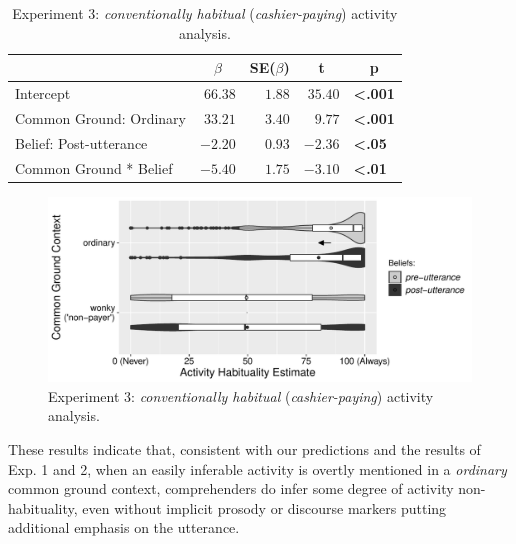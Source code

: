 \documentclass{sp}\usepackage[]{graphicx}\usepackage[]{color}
\makeatletter
\def\maxwidth{ %
  \ifdim\Gin@nat@width>\linewidth
    \linewidth
  \else
    \Gin@nat@width
  \fi
}
\newenvironment{knitrout}{}{} %
\makeatother
\begin{document}
\begin{table}[ht]
\caption{Experiment 3: \textit{conventionally habitual} (\textit{cashier-paying}) activity analysis.\label{tab:exp3habitual}} 
\begin{center}
\begin{tabular}{lrrrl}
\toprule
\multicolumn{1}{l}{}&\multicolumn{1}{c}{$\beta$}&\multicolumn{1}{c}{SE($\beta$)}&\multicolumn{1}{c}{\textbf{t}}&\multicolumn{1}{c}{\textbf{p}}\tabularnewline
\midrule
Intercept&$66.38$&$1.88$&$35.40$&\textbf{\textless .001}\tabularnewline
Common Ground: Ordinary&$33.21$&$3.40$&$ 9.77$&\textbf{\textless .001}\tabularnewline
Belief: Post-utterance&$-2.20$&$0.93$&$-2.36$&\textbf{\textless .05}\tabularnewline
Common Ground * Belief&$-5.40$&$1.75$&$-3.10$&\textbf{\textless .01}\tabularnewline
\bottomrule
\end{tabular}\end{center}
\end{table}


\begin{knitrout}
\color{fgcolor}\begin{figure}
\includegraphics[width=\maxwidth]{figure/unnamed-chunk-54-1} \caption{\label{fig:exp3habitual}Experiment 3: \textit{conventionally habitual} (\textit{cashier-paying}) activity analysis.}\label{fig:unnamed-chunk-54}
\end{figure}


\end{knitrout}

These results indicate that, consistent with our predictions and the results of Exp. 1 and 2, when an easily inferable activity is overtly mentioned in a \textit{ordinary} common ground context, comprehenders do infer some degree of activity non-habituality, even without implicit prosody or discourse markers putting additional emphasis on the utterance.
\end{document}
